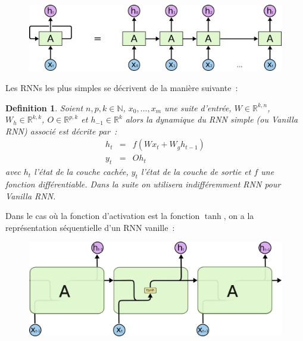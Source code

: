 \documentclass[11pt]{scrartcl} %
\newtheorem{Def}[theorem]{Definition}
\newcommand{\N}{\mathbb{N}}
\newcommand{\R}{\mathbb{R}}
\begin{document}
\begin{figure}[h]
	\begin{center}
		\includegraphics[scale=.3]{RNN-unrolled.png}
	\end{center}
\end{figure}

Les RNNs les plus simples se décrivent de la manière suivante~:
\begin{Def}\label{VanillaRNN}
Soient $n,p,k\in \N$, $x_0,...,x_m$ une suite d'entrée, $W\in \R^{k,n}$, $W_h\in \R^{k,k}$, $O\in \R^{p,k}$ et $h_{-1}\in\R^k$ alors la dynamique du RNN simple (ou Vanilla RNN) associé est décrite par~:
\begin{eqnarray}
h_t &=& f(Wx_t+W_gh_{t-1})\\
y_t&=&Oh_t
\end{eqnarray}
avec $h_t$ l'état de la couche cachée, $y_t$ l'état de la couche de sortie et $f$ une fonction différentiable. Dans la suite on utilisera indifféremment RNN pour \textit{Vanilla RNN}.
\end{Def}



Dans le cas où la fonction d'activation est la fonction $\tanh$, on a la représentation séquentielle d'un RNN vanille~: 
\newline


\begin{figure}[h]
	\begin{center}
		\includegraphics[scale=.5]{LSTM3-SimpleRNN.png}
	\end{center}
\end{figure}
\end{document}
